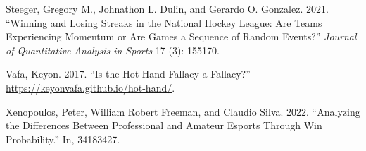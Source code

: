 \documentclass{article}
\newlength{\cslhangindent}
\newlength{\cslentryspacingunit} %
\newenvironment{CSLReferences}[2] %
 {%
  \setlength{\parindent}{0pt}
  \ifodd #1
  \let\oldpar\par
  \def\par{\hangindent=\cslhangindent\oldpar}
  \fi
  \setlength{\parskip}{#2\cslentryspacingunit}
 }%
 {}
\begin{document}
\begin{CSLReferences}{1}{0}
\leavevmode{}%
Steeger, Gregory M., Johnathon L. Dulin, and Gerardo O. Gonzalez. 2021.
{``Winning and Losing Streaks in the National Hockey League: Are Teams
Experiencing Momentum or Are Games a Sequence of Random Events?''}
\emph{Journal of Quantitative Analysis in Sports} 17 (3): 155170.

\leavevmode{}%
Vafa, Keyon. 2017. {``Is the Hot Hand Fallacy a Fallacy?''}
\url{https://keyonvafa.github.io/hot-hand/}.

\leavevmode{}%
Xenopoulos, Peter, William Robert Freeman, and Claudio Silva. 2022.
{``Analyzing the Differences Between Professional and Amateur Esports
Through Win Probability.''} In, 34183427.

\end{CSLReferences}



\end{document}
